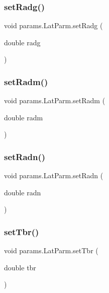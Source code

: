 \subsubsection{\texorpdfstring{set\+Radg()}{setRadg()}}
{\footnotesize\ttfamily void params.\+Lat\+Parm.\+set\+Radg (\begin{DoxyParamCaption}\item[{double}]{radg }\end{DoxyParamCaption})}

\mbox{\label{classparams_1_1_lat_parm_a00c0204cb9ef92752ffd4a869b780360}} 
\subsubsection{\texorpdfstring{set\+Radm()}{setRadm()}}
{\footnotesize\ttfamily void params.\+Lat\+Parm.\+set\+Radm (\begin{DoxyParamCaption}\item[{double}]{radm }\end{DoxyParamCaption})}

\mbox{\label{classparams_1_1_lat_parm_a59b9f34911eaf1358f7b5b409d7bf0b4}} 
\subsubsection{\texorpdfstring{set\+Radn()}{setRadn()}}
{\footnotesize\ttfamily void params.\+Lat\+Parm.\+set\+Radn (\begin{DoxyParamCaption}\item[{double}]{radn }\end{DoxyParamCaption})}

\mbox{\label{classparams_1_1_lat_parm_a91313d31ec47399198769d5c8dc7c8ca}} 
\subsubsection{\texorpdfstring{set\+Tbr()}{setTbr()}}
{\footnotesize\ttfamily void params.\+Lat\+Parm.\+set\+Tbr (\begin{DoxyParamCaption}\item[{double}]{tbr }\end{DoxyParamCaption})}

